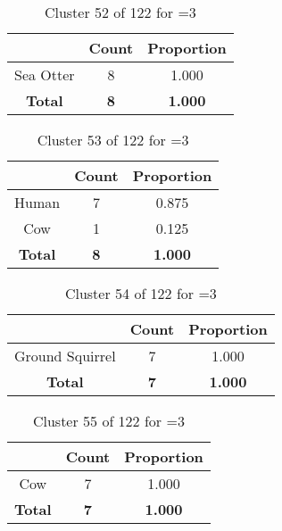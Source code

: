 \begin{table}[ht!]
\centering
\begin{tabular}{|c|c|c|}
\hline
\bf \Spec{} &\bf Count &\bf Proportion\\ \hline \hline
Sea Otter & 8 & 1.000\\ \hline
\hline
\bf Total & \bf 8 & \bf 1.000\\ \hline
\end{tabular}
\label{tab:cluster:52:3}
\caption{Cluster 52 of 122 for \minneigh{}=3}
\end{table}

\begin{table}[ht!]
\centering
\begin{tabular}{|c|c|c|}
\hline
\bf \Spec{} &\bf Count &\bf Proportion\\ \hline \hline
Human & 7 & 0.875\\ \hline
Cow & 1 & 0.125\\ \hline
\hline
\bf Total & \bf 8 & \bf 1.000\\ \hline
\end{tabular}
\label{tab:cluster:53:3}
\caption{Cluster 53 of 122 for \minneigh{}=3}
\end{table}

\begin{table}[ht!]
\centering
\begin{tabular}{|c|c|c|}
\hline
\bf \Spec{} &\bf Count &\bf Proportion\\ \hline \hline
Ground Squirrel & 7 & 1.000\\ \hline
\hline
\bf Total & \bf 7 & \bf 1.000\\ \hline
\end{tabular}
\label{tab:cluster:54:3}
\caption{Cluster 54 of 122 for \minneigh{}=3}
\end{table}

\begin{table}[ht!]
\centering
\begin{tabular}{|c|c|c|}
\hline
\bf \Spec{} &\bf Count &\bf Proportion\\ \hline \hline
Cow & 7 & 1.000\\ \hline
\hline
\bf Total & \bf 7 & \bf 1.000\\ \hline
\end{tabular}
\label{tab:cluster:55:3}
\caption{Cluster 55 of 122 for \minneigh{}=3}
\end{table}

